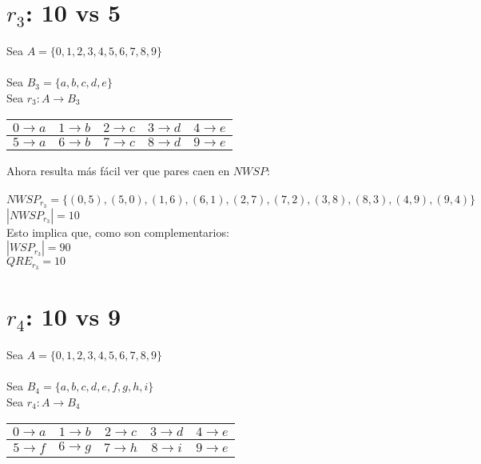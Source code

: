 	\newpage
	\section{$r_{3}$: 10 vs 5}
	
	\noindent
	Sea $A=\{0,1,2,3,4,5,6,7,8,9\}$\\\\
	Sea $B_{3} = \{a,b,c,d,e\}$
	\\
	
	\noindent
	Sea $r_{3}:A \longrightarrow B_{3}$
	\begin{table}[h!]
		\begin{tabular}{|c|c|c|c|c|}
			\hline
			$0 \longrightarrow a$ & $1 \longrightarrow b$ & $2 \longrightarrow c$ & $3 \longrightarrow d$ & $4 \longrightarrow e$ \\ 
			\hline
			$5 \longrightarrow a$ & $6 \longrightarrow b$ & $7 \longrightarrow c$ & $8 \longrightarrow d$ & $9 \longrightarrow e$ \\  
			\hline
		\end{tabular}
	\end{table}
	
	\noindent
	Ahora resulta más fácil ver que pares caen en $NWSP$: \\\\
	$NWSP_{r_{3}}=\{ (0,5), (5,0), (1,6), (6,1), (2,7), (7,2), (3,8), (8,3), (4,9), (9,4)\}$\\
	$|NWSP_{r_{3}}| = 10$\\
	Esto implica que, como son complementarios:\\
	$|WSP_{r_{3}}| = 90$\\
	$QRE_{r_{3}}=10$
	\\
	
	\section{$r_{4}$: 10 vs 9}
	
	\noindent
	Sea $A=\{0,1,2,3,4,5,6,7,8,9\}$\\\\
	Sea $B_{4} = \{a,b,c,d,e,f,g,h,i\}$
	\\
	
	\noindent
	Sea $r_{4}:A \longrightarrow B_{4}$
	\begin{table}[h!]
		\begin{tabular}{|c|c|c|c|c|}
			\hline
			$0 \longrightarrow a$ & $1 \longrightarrow b$ & $2 \longrightarrow c$ & $3 \longrightarrow d$ & $4 \longrightarrow e$ \\ 
			\hline
			$5 \longrightarrow f$ & $6 \longrightarrow g$ & $7 \longrightarrow h$ & $8 \longrightarrow i$ & $9 \longrightarrow e$ \\  
			\hline
		\end{tabular}
	\end{table}
	
